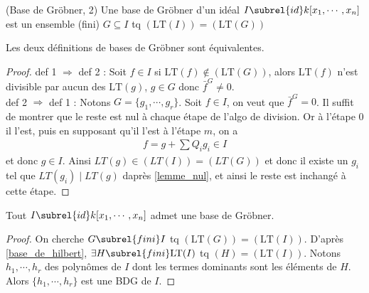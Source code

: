             \begin{defi} (Base de Gröbner, 2)
                Une base de Gröbner d'un idéal $I \subrel{id} k[x_1, \cdots, x_n]$ est un ensemble (fini) $G \subseteq I$ tq $(\mathrm{LT}(I)) = (\mathrm{LT}(G))$
            \end{defi}
            \begin{theo}
                Les deux définitions de bases de Gröbner sont équivalentes.
            \end{theo}
            \begin{proof}
                def 1 $\Rightarrow$ def 2 : Soit $f \in I$ si $\mathrm{LT}(f) \notin (\mathrm{LT}(G))$, alors $\mathrm{LT}(f)$ n'est divisible par aucun des $\mathrm{LT}(g)$, $g \in G$ donc $\bar f^G \neq 0$. \\
                def 2 $\Rightarrow$ def 1 : Notons $G = \{g_1, \cdots, g_r\}$. Soit $f \in I$, on veut que $\bar f^G = 0$. Il suffit de montrer que le reste est nul à chaque étape de l'algo de division. Or à l'étape $0$ il l'est, puis en supposant qu'il l'est à l'étape $m$, on a
                \begin{align*}
                    f = g + \sum Q_i g_i \in I
                \end{align*}
                et donc $g \in I$. Ainsi $LT(g) \in (LT(I)) = (LT(G))$ et donc il existe un $g_i$ tel que $LT(g_i) \mid LT(g)$ daprès \ref{lemme_nul}, et ainsi le reste est inchangé à cette étape.
            \end{proof}
            \begin{theo}
                Tout $I \subrel{id} k[x_1, \cdots, x_n]$ admet une base de Gröbner.
            \end{theo}
            \begin{proof}
                On cherche $G \subrel{fini} I$ tq $(\mathrm{LT}(G)) = (\mathrm{LT}(I))$. D'après \ref{base_de_hilbert}, $\exists H \subrel{fini} \mathrm{LT}(I)$ tq $(H) = (\mathrm{LT}(I))$. Notons $h_1, \cdots, h_r$ des polynômes de $I$ dont les termes dominants sont les éléments de $H$. Alors $\{h_1, \cdots, h_r\}$ est une BDG de $I$.
            \end{proof}

